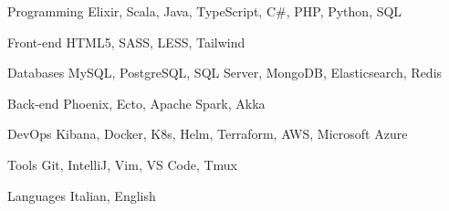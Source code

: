 \documentclass{resume} %
\begin{document}
\begin{cvSkills}


  \cvSkill
    {Programming}
    {Elixir, Scala, Java, TypeScript, C\#, PHP, Python, SQL}


  \cvSkill
    {Front-end}
    {HTML5, SASS, LESS, Tailwind}


  \cvSkill
    {Databases}
    {MySQL, PostgreSQL, SQL Server, MongoDB, Elasticsearch, Redis}


  \cvSkill
    {Back-end}
    {Phoenix, Ecto, Apache Spark, Akka}


  \cvSkill
    {DevOps}
    {Kibana, Docker, K8s, Helm, Terraform, AWS, Microsoft Azure}


  \cvSkill
    {Tools}
    {Git, IntelliJ, Vim, VS Code, Tmux}


  \cvSkill
    {}{}


  \cvSkill
    {Languages}
    {Italian, English}


\end{cvSkills}



\end{document}
